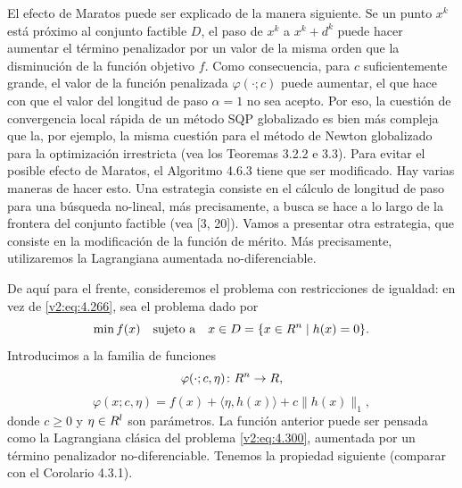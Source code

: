 El efecto de Maratos puede ser explicado de la manera siguiente. Se un punto $x^k$ está próximo al conjunto factible $D$, el paso de $x^k$ a $x^k + d^k$ puede hacer aumentar el término penalizador por un valor de la misma orden que la disminución de la función objetivo $f$. Como consecuencia, para $c$ suficientemente grande, el valor de la función penalizada $\varphi(\cdot; c)$ puede aumentar, el que hace con que el valor del longitud de paso $\alpha = 1$ no sea acepto. Por eso, la cuestión de convergencia local rápida de un método SQP globalizado es bien más compleja que la, por ejemplo, la misma cuestión para el método de Newton globalizado para la optimización irrestricta (vea los Teoremas 3.2.2 e 3.3). Para evitar el posible efecto de Maratos, el Algoritmo 4.6.3 tiene que ser modificado. Hay varias maneras de hacer esto. Una estrategia consiste en el cálculo de longitud de paso para una búsqueda no-lineal, más precisamente, a busca se hace a lo largo de la frontera del conjunto factible (vea [3, 20]). Vamos a presentar otra estrategia, que consiste en la modificación de la función de mérito. Más precisamente, utilizaremos la Lagrangiana aumentada no-diferenciable.

De aquí para el frente, consideremos el problema con restricciones de igualdad: en vez de \eqref{v2:eq:4.266}, sea el problema dado por
\begin{equation}
    \min f(x) \quad \text{sujeto a} \quad x \in D = \{x \in R^n \mid h(x) = 0\}.
    \label{v2:eq:4.300}
\end{equation}
Introducimos a la familia de funciones
\[
    \varphi(\cdot; c, \eta) \colon R^n \to R,
\]
\begin{equation}
    \varphi(x; c, \eta) = f(x) + \langle \eta, h(x) \rangle + c\|h(x)\|_1,
    \label{v2:eq:4.301}
\end{equation}
donde $c \ge 0$ y $\eta \in R^l$ son parámetros. La función anterior puede ser pensada como la Lagrangiana clásica del problema \eqref{v2:eq:4.300}, aumentada por un término penalizador no-diferenciable.
Tenemos la propiedad siguiente (comparar con el Corolario 4.3.1).

